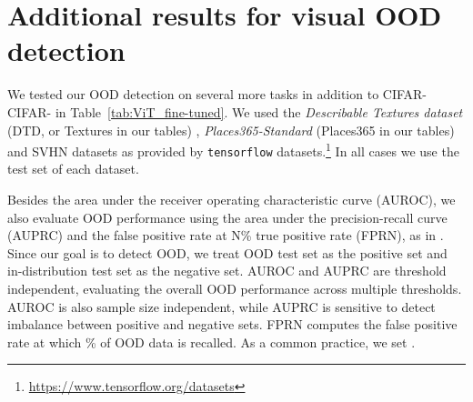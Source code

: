 \documentclass{article}
\begin{document}
\section{Additional results for visual OOD detection}\label{sec:app:additional}
We tested our OOD detection on several more tasks in addition to CIFAR- CIFAR- in Table~\ref{tab:ViT_fine-tuned}. We used the \textit{Describable Textures dataset} (DTD, or Textures in our tables) \citep{cimpoi14describing}, \textit{Places365-Standard} (Places365 in our tables) \citep{zhou2017places} and SVHN \citet{Netzer2011} datasets as provided by \verb|tensorflow| datasets.\footnote{\url{https://www.tensorflow.org/datasets}} In all cases we use the test set of each dataset. 


Besides the area under the receiver operating characteristic curve  (AUROC), we also evaluate OOD performance using the area under the precision-recall curve (AUPRC) and the false positive rate at N\% true positive rate (FPRN), as in \cite{hendrycks2018deep}.
Since our goal is to detect OOD, we treat OOD test set as the positive set and in-distribution test set as the negative set. 
AUROC and AUPRC are threshold independent, evaluating the overall OOD performance across multiple thresholds. 
AUROC is also sample size independent, while AUPRC is sensitive to detect imbalance between positive and negative sets. 
FPRN computes the false positive rate at which \% of OOD data is recalled. As a common practice, we set . 
\end{document}
